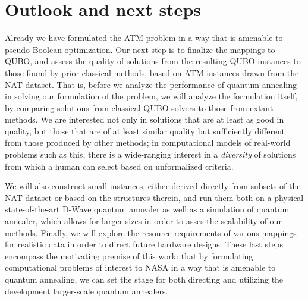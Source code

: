 \section*{Outlook and next steps}\label{sec:ass}

Already we have formulated the ATM problem in a way that is amenable to pseudo-Boolean optimization.
Our next step is to finalize the mappings to QUBO, and assess the quality of solutions from the resulting QUBO instances to those found by prior classical methods, based on ATM instances drawn from the NAT dataset.
That is, before we analyze the performance of quantum annealing in solving our formulation of the problem, we will analyze the formulation itself, by comparing solutions from classical QUBO solvers to those from extant methods.
We are interested not only in solutions that are at least as good in quality, but those that are of at least similar quality but sufficiently different from those produced by other methods; in computational models of real-world problems such as this, there is a wide-ranging interest in a \emph{diversity} of solutions from which a human can select based on unformalized criteria.

We will also construct small instances, either derived directly from subsets of the NAT dataset or based on the structures therein, and run them both on a physical state-of-the-art D-Wave quantum annealer as well as a simulation of quantum annealer, which allows for larger sizes in order to asses the scalability of our methods.
Finally, we will explore the resource requirements of various mappings for realistic data in order to direct future hardware designs.
These last steps encompass the motivating premise of this work: that by formulating computational problems of interest to NASA in a way that is amenable to quantum annealing, we can set the stage for both directing and utilizing the development larger-scale quantum annealers.

